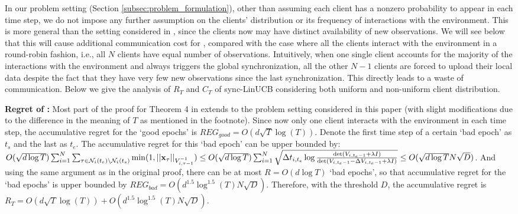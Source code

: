 In our problem setting (Section \ref{subsec:problem_formulation}), other than assuming each client has a nonzero probability to appear in each time step, we do not impose any further assumption on the clients’ distribution or its frequency of interactions with the environment. This is more general than the setting considered in \cite{wang2019distributed}, since the clients now may have distinct availability of new observations. We will see below that this will cause additional communication cost for \modelbaseline{}, compared with the case where all the clients interact with the environment in a round-robin fashion, i.e., all $N$ clients have equal number of observations.
Intuitively, when one single client accounts for the majority of the interactions with the environment and always triggers the global synchronization, all the other $N-1$ clients are forced to upload their local data despite the fact that they have very few new observations since the last synchronization. This directly leads to a waste of communication.
Below we give the analysis of $R_{T}$ and $C_{T}$ of sync-LinUCB considering both uniform and non-uniform client distribution.

\noindent \textbf{Regret of \modelbaseline{}: }
Most part of the proof for Theorem 4 in \cite{wang2019distributed} extends to the problem setting considered in this paper (with slight modifications due to the difference in the meaning of $T$ as mentioned in the footnote). Since now only one client interacts with the environment in each time step, the accumulative regret for the `good epochs' is $REG_{good}=O(d\sqrt{T}\log(T))$. Denote the first time step of a certain `bad epoch' as $t_{s}$ and the last as $t_{e}$. The accumulative regret for this `bad epoch' can be upper bounded by: $O(\sqrt{d\log{T}})\sum_{i=1}^{N}\sum_{\tau \in \mathcal{N}_{i}(t_{e})\setminus \mathcal{N}_{i}(t_{s})}\min(1,||\mathbf{x}_{\tau}||_{V_{i,\tau-1}^{-1}})\leq  O(\sqrt{d\log{T}})\sum_{i=1}^{N} \sqrt{\Delta t_{i,t_{e}}\log{\frac{\det(V_{i,t_{e}-1}+\lambda I)}{\det(V_{i,t_{e}-1}-\Delta{V}_{i,t_{e}-1}+\lambda I)}}} \leq O(\sqrt{d \log{T}} N \sqrt{D})$. And using the same argument as in the original proof, there can be at most $R=O(d \log{T})$ `bad epochs', so that accumulative regret for the `bad epochs' is upper bounded by $REG_{bad}=O(d^{1.5}\log^{1.5}{(T)}N\sqrt{D})$. Therefore, with the threshold $D$, the accumulative regret is $R_{T}=O(d\sqrt{T}\log(T))+O(d^{1.5}\log^{1.5}{(T)}N\sqrt{D})$.


